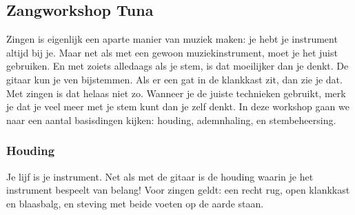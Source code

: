 \subsection*{Zangworkshop Tuna}   %
\footnotesize
Zingen is eigenlijk een aparte manier van muziek maken: je hebt je instrument altijd bij je. Maar net als met een gewoon muziekinstrument, moet je het juist gebruiken. En met zoiets alledaags als je stem, is dat moeilijker dan je denkt. De gitaar kun je ven bijstemmen. Als er een gat in de klankkast zit, dan zie je dat. Met zingen is dat helaas niet zo. Wanneer je de juiste technieken gebruikt, merk je dat je veel meer met je stem kunt dan je zelf denkt. In deze workshop gaan we naar een aantal basisdingen kijken: houding, ademnhaling, en stembeheersing.

\subsubsection*{Houding}
Je lijf is je instrument. Net als met de gitaar is de houding waarin je het instrument bespeelt van belang! Voor zingen geldt: een recht rug, open klankkast en blaasbalg, en steving met beide voeten op de aarde staan.
